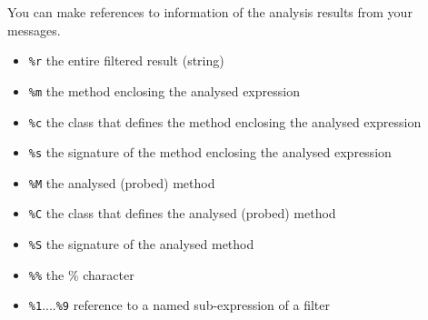 You can make references to information of the analysis results from your messages.
\begin{itemize}
\item \verb!%r! the entire filtered result (string)
\item \verb!%m! the method enclosing the analysed expression
\item \verb!%c! the class that defines the method enclosing the analysed expression
\item \verb!%s! the signature of the method enclosing the analysed expression
\item \verb!%M! the analysed (probed) method
\item \verb!%C! the class that defines the analysed (probed) method
\item \verb!%S! the signature of the analysed method
\item \verb!%%! the \% character
\item \verb!%1!....\verb!%9! reference to a named sub-expression of a filter
\end{itemize}



